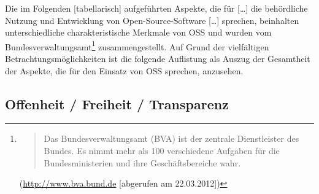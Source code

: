 \documentclass[a4paper]{scrartcl}
\begin{document}
Die im Folgenden [tabellarisch] aufgeführten Aspekte, die für [\ldots]
  die behördliche Nutzung und Entwicklung von Open-Source-Software [\ldots]
  sprechen, beinhalten unterschiedliche charakteristische Merkmale von OSS und
  wurden vom Bundesverwaltungsamt\footnote{\begin{quote}Das Bundesverwaltungsamt
    (BVA) ist der zentrale Dienstleister des Bundes. Es nimmt mehr als 100
    verschiedene Aufgaben für die Bundesministerien und ihre Geschäftsbereiche
    wahr.\end{quote} (\href{http://www.bva.bund.de/}{http://www.bva.bund.de} [abgerufen am
  22.03.2012])} zusammengestellt. Auf Grund der vielfältigen
Betrachtungsmöglichkeiten ist die folgende Auflistung als Auszug der Gesamtheit
der Aspekte, die für den Einsatz von OSS sprechen, anzusehen.

\subsection{Offenheit / Freiheit / Transparenz}
\end{document}
